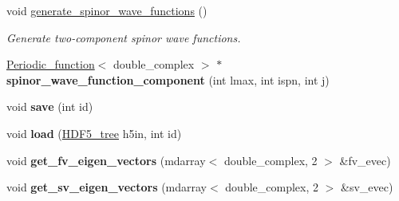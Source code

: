 \begin{DoxyCompactItemize}
\item 
void \hyperlink{classsirius_1_1_k__point_a36a79c489df101418b195e4c3ae4eaec}{generate\+\_\+spinor\+\_\+wave\+\_\+functions} ()
\begin{DoxyCompactList}\small\item\em Generate two-\/component spinor wave functions. \end{DoxyCompactList}\item 
\hypertarget{classsirius_1_1_k__point_ae27a544f307eb8ffee92f136508f3e61}{}\hyperlink{classsirius_1_1_periodic__function}{Periodic\+\_\+function}$<$ double\+\_\+complex $>$ $\ast$ {\bfseries spinor\+\_\+wave\+\_\+function\+\_\+component} (int lmax, int ispn, int j)\label{classsirius_1_1_k__point_ae27a544f307eb8ffee92f136508f3e61}

\item 
\hypertarget{classsirius_1_1_k__point_ace212955b62fd77b8907ac1b95042de2}{}void {\bfseries save} (int id)\label{classsirius_1_1_k__point_ace212955b62fd77b8907ac1b95042de2}

\item 
\hypertarget{classsirius_1_1_k__point_a09d169ed1bd2c79b16205eed05ee7718}{}void {\bfseries load} (\hyperlink{classsirius_1_1_h_d_f5__tree}{H\+D\+F5\+\_\+tree} h5in, int id)\label{classsirius_1_1_k__point_a09d169ed1bd2c79b16205eed05ee7718}

\item 
\hypertarget{classsirius_1_1_k__point_af53b23b454504e7a02cf3e1e514dfac7}{}void {\bfseries get\+\_\+fv\+\_\+eigen\+\_\+vectors} (mdarray$<$ double\+\_\+complex, 2 $>$ \&fv\+\_\+evec)\label{classsirius_1_1_k__point_af53b23b454504e7a02cf3e1e514dfac7}

\item 
\hypertarget{classsirius_1_1_k__point_a6bbfd4d62eebd914a9c572f644eeec81}{}void {\bfseries get\+\_\+sv\+\_\+eigen\+\_\+vectors} (mdarray$<$ double\+\_\+complex, 2 $>$ \&sv\+\_\+evec)\label{classsirius_1_1_k__point_a6bbfd4d62eebd914a9c572f644eeec81}


\end{DoxyCompactItemize}
